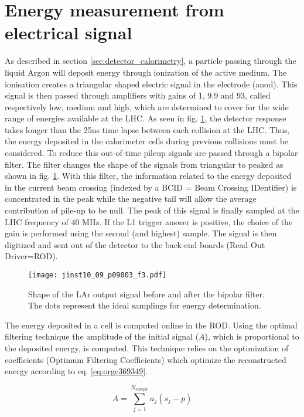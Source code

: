 \section{Energy measurement from electrical signal}
\label{Calibration_OFC}
As described in section \ref{sec:detector_calorimetry}, a particle passing through the liquid Argon will deposit energy through ionization of the active medium.
The ionisation creates a triangular shaped electric signal in the electrode (anod).
This signal is then passed through amplifiers with gains of 1, 9.9 and 93, called respectively low, medium and high,  which are determined to cover for the wide range of energies available at the LHC.
As seen in fig. \ref{fig:org389d992}, the detector response takes longer than the 25ns time lapse between each collision at the LHC.
Thus, the energy deposited in the calorimeter cells during previous collisions must be considered.
To reduce this out-of-time pileup signals are passed through a bipolar filter.
The filter changes the shape of the signals from triangular to peaked as shown in fig. \ref{fig:org389d992}.
With this filter, the information related to the energy deposited in the current beam crossing (indexed by a BCID = Beam Crossing IDentifier) is concentrated in the peak while the negative tail will allow the average contribution of pile-up to be null.
The peak of this signal is finally sampled at the LHC frequency of 40 MHz.
If the L1 trigger answer is positive, the choice of the gain is performed using the second (and highest) sample.
The signal is then digitized and sent out of the detector to the back-end boards (Read Out Driver=ROD).

\begin{figure}[htbp]
\centering
\texttt{[image: jinst10\_09\_p09003\_f3.pdf]}
\caption{\label{fig:org389d992}
Shape of the LAr output signal before and after the bipolar filter. The dots represent the ideal samplings for energy determination.\cite{jinst_p09003}}
\end{figure}

The energy deposited in a cell is computed online in the ROD.
Using the optimal filtering technique \cite{Cleland:2002rya} the amplitude of the initial signal (\(A\)), which is proportional to the deposited energy, is computed.
This technique relies on the optimization of coefficients (Optimum Filtering Coefficients) which optimize the reconstructed energy according to eq. \ref{eq:orge369349}.

\begin{equation}
\label{eq:orge369349}
A = \sum_{j=1}^{N_{sample}} a_j(s_j-p)
\end{equation}

